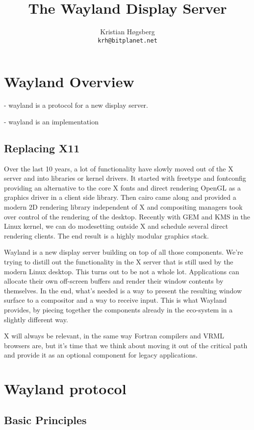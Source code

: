 \documentclass{article}
\author{Kristian Høgsberg\\
\texttt{krh@bitplanet.net}
}
\title{The Wayland Display Server}
\begin{document}
\maketitle

\section{Wayland Overview}

 - wayland is a protocol for a new display server.  

 - wayland is an implementation

\subsection{Replacing X11}

Over the last 10 years, a lot of functionality have slowly moved out
of the X server and into libraries or kernel drivers. It started with
freetype and fontconfig providing an alternative to the core X fonts
and direct rendering OpenGL as a graphics driver in a client side
library. Then cairo came along and provided a modern 2D rendering
library independent of X and compositing managers took over control of
the rendering of the desktop. Recently with GEM and KMS in the Linux
kernel, we can do modesetting outside X and schedule several direct
rendering clients. The end result is a highly modular graphics stack.

Wayland is a new display server building on top of all those
components. We’re trying to distill out the functionality in the X
server that is still used by the modern Linux desktop. This turns out
to be not a whole lot. Applications can allocate their own off-screen
buffers and render their window contents by themselves. In the end,
what’s needed is a way to present the resulting window surface to a
compositor and a way to receive input. This is what Wayland provides,
by piecing together the components already in the eco-system in a
slightly different way.

X will always be relevant, in the same way Fortran compilers and VRML
browsers are, but it’s time that we think about moving it out of the
critical path and provide it as an optional component for legacy
applications.


\section{Wayland protocol}

\subsection{Basic Principles}
\end{document}
